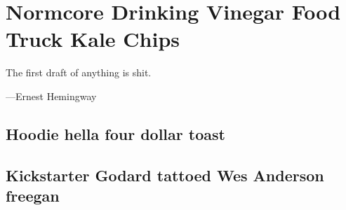 \chapter{Normcore Drinking Vinegar Food Truck Kale Chips}\label{chapter:theory}

\epigraph{The first draft of anything is shit.}{%
    ---Ernest Hemingway}

\noindent \kant[123-125]

\kant[126-128]

\section{Hoodie hella four dollar toast}

\kant[148-151]

\section{Kickstarter Godard tattoed Wes Anderson freegan}

\kant[44-47]
